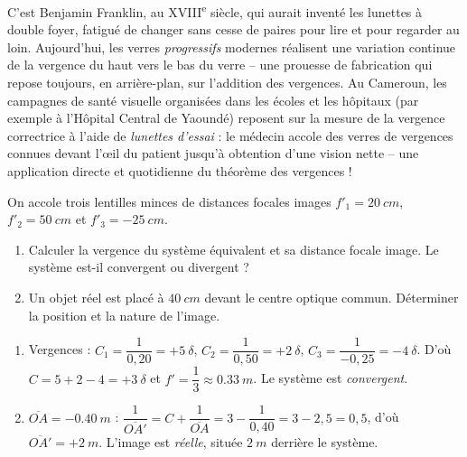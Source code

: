 \documentclass[11pt]{article}
\begin{document}
\begin{savaistu}
C'est Benjamin Franklin, au XVIII\textsuperscript{e} siècle, qui aurait inventé les lunettes à double foyer, fatigué de changer sans cesse de paires pour lire et pour regarder au loin. Aujourd'hui, les verres \emph{progressifs} modernes réalisent une variation continue de la vergence du haut vers le bas du verre -- une prouesse de fabrication qui repose toujours, en arrière-plan, sur l'addition des vergences. Au Cameroun, les campagnes de santé visuelle organisées dans les écoles et les hôpitaux (par exemple à l'Hôpital Central de Yaoundé) reposent sur la mesure de la vergence correctrice à l'aide de \emph{lunettes d'essai} : le médecin accole des verres de vergences connues devant l'œil du patient jusqu'à obtention d'une vision nette -- une application directe et quotidienne du théorème des vergences !
\end{savaistu}

\begin{exercice}
On accole trois lentilles minces de distances focales images $f'_1 = \SI{20}{cm}$, $f'_2 = \SI{50}{cm}$ et $f'_3 = -\SI{25}{cm}$.
\begin{enumerate}
\item Calculer la vergence du système équivalent et sa distance focale image. Le système est-il convergent ou divergent ?
\item Un objet réel est placé à $\SI{40}{cm}$ devant le centre optique commun. Déterminer la position et la nature de l'image.
\end{enumerate}
\end{exercice}

\begin{corrige}
\begin{enumerate}
\item Vergences : $C_1 = \dfrac{1}{0,20} = +5\ \delta$, $C_2 = \dfrac{1}{0,50} = +2\ \delta$, $C_3 = \dfrac{1}{-0,25} = -4\ \delta$. D'où $C = 5 + 2 - 4 = +3\ \delta$ et $f' = \dfrac{1}{3} \approx \SI{0,33}{m}$. Le système est \emph{convergent}.
\item $\overline{OA} = -\SI{0,40}{m}$ : $\dfrac{1}{\overline{OA'}} = C + \dfrac{1}{\overline{OA}} = 3 - \dfrac{1}{0,40} = 3 - 2,5 = 0,5$, d'où $\overline{OA'} = +\SI{2}{m}$. L'image est \emph{réelle}, située $\SI{2}{m}$ derrière le système.
\end{enumerate}
\end{corrige}
\end{document}
